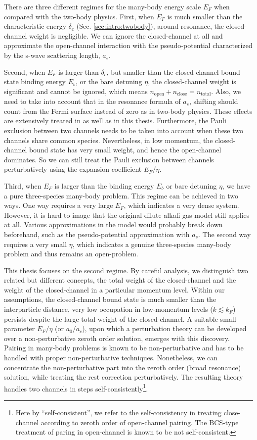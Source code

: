 There are three different regimes for the many-body energy scale $E_F$ when compared with the two-body physics.  
First, when $E_F$ is much smaller than the characteristic energy $\delta_c$ (Sec. \ref{sec:intro:twobody}), around resonance, the closed-channel weight is negligible. We can ignore the closed-channel at all and approximate the open-channel interaction with the pseudo-potential characterized by the s-wave scattering length, $a_s$. 

Second, when $E_F$ is larger than $\delta_c$, but smaller than the closed-channel bound state binding energy $E_b$, or the bare detuning $\eta$, the closed-channel weight is significant and cannot be ignored, which means $n_{\text{open}}+n_{\text{close}}=n_{\text{total}}$. Also, we need to take into account that in the resonance formula of $a_s$, shifting should count from the Fermi surface instead of zero as in two-body physics.    These effects are  extensively treated in \cite{GurarieNarrow} as well as in this thesis.  Furthermore, the Pauli exclusion between two channels needs to be taken into account when these two channels share common species.  Nevertheless, in  low momentum, the closed-channel bound state has very small weight, and hence the open-channel dominates.  So we can still treat the Pauli exclusion between channels perturbatively using the expansion coefficient  $E_F/\eta$.  

Third, when $E_F$ is larger than the binding energy $E_b$ or bare detuning $\eta$, we have a pure three-species many-body problem. This regime can be achieved in two ways.  One way requires a very large $E_F$, which indicates a very dense system.  However, it is hard to image that  the original dilute alkali gas model still applies at all. Various approximations in the model would probably break down beforehand, such as the pseudo-potential approximation with $a_s$. The second way requires a very small $\eta$, which indicates a genuine three-species many-body problem and thus remains an open-problem.   

This thesis focuses on the second regime.  By careful analysis, we distinguish two related but different concepts, the total weight of the closed-channel  and the weight of the closed-channel in a particular momentum level.  
       Within our assumptions, the closed-channel bound state is much smaller than the interparticle distance, very low occupation in low-momentum levels ($k\lesssim{}k_{F}$) persists despite the large total weight of the closed-channel.     A suitable small parameter $E_F/\eta$ (or $a_0/a_c$), upon which a perturbation theory can be developed over a non-perturbative zeroth order solution, emerges with this discovery.  Pairing in many-body problems is known to be  non-perturbative and has to be handled with proper non-perturbative techniques.  Nonetheless, we can concentrate the non-perturbative part into the zeroth order  (broad resonance) solution, while treating the rest correction perturbatively.   The resulting theory  handles two channels in steps self-consistently\footnote{Here by ``self-consistent'', we refer to the self-consistency in treating close-channel according to zeroth order of open-channel pairing.  The BCS-type treatment of paring in open-channel   is known to be not self-consistent. }. 
       
